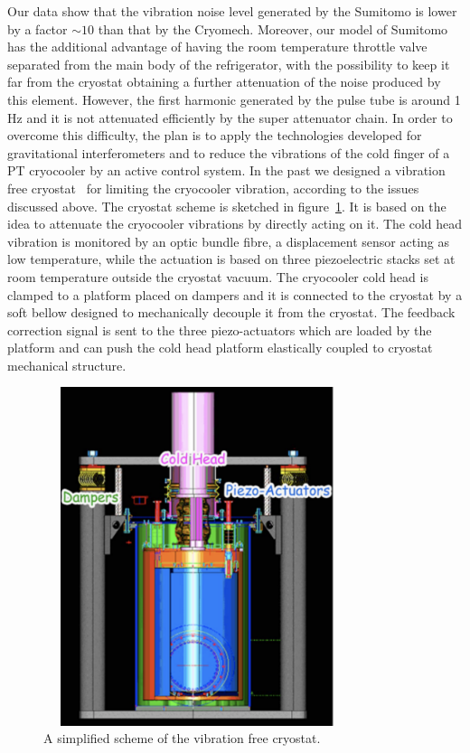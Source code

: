 Our data show that the vibration noise level generated by the Sumitomo is lower by a factor $\sim 10$ than that by the Cryomech. 
Moreover, our model of Sumitomo has the additional advantage of having the room temperature throttle valve separated from the main body of the refrigerator, with the possibility to keep it far from the cryostat obtaining a further attenuation of the noise produced by this element.
However, the first harmonic generated by the pulse tube is around 1 Hz and it is not attenuated efficiently by the super attenuator chain.  In order to overcome this difficulty, the plan is to apply the technologies developed for  gravitational interferometers and to reduce the vibrations of the cold finger of a PT  cryocooler by an active control system.  In the past we  designed a vibration free cryostat~\cite{VFC}  for limiting the cryocooler vibration, according to the issues discussed above.  The cryostat scheme is sketched in  figure~\ref{fig:cryostat_scheme}.  It is based on the idea to attenuate the cryocooler vibrations by directly acting on it. 
 The cold head vibration  is monitored by  an  optic bundle fibre, a displacement sensor acting as low temperature,  while the actuation is based  on three piezoelectric stacks set  at room temperature outside the cryostat vacuum.  
The cryocooler cold head is clamped to a platform placed on dampers and it is connected to the cryostat by a soft  bellow designed to mechanically decouple it from the cryostat. The feedback correction signal is sent to the three piezo-actuators which are loaded by the platform and can push the cold head platform elastically coupled to cryostat mechanical structure.

\begin{figure}[htbp]
\begin{center}
\includegraphics[width=9cm, height=9.9cm]{./Sec_SiteInfra/Figures/cryostat_scheme.pdf}
\caption{{A simplified scheme of the vibration free cryostat.}}
\label{fig:cryostat_scheme}
\end{center}
\end{figure}


